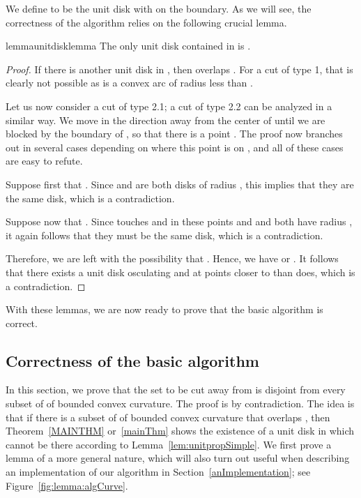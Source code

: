 \documentclass{article}
\begin{document}
We define  to be the unit disk with  on the boundary.
As we will see, the correctness of the algorithm relies on the following crucial lemma.


\begin{restatable}{lemma}{unitdisklemma}
\label{lem:unitpropSimple}
The only unit disk contained in  is .
\end{restatable}

\begin{proof}
If there is another unit disk  in , then  overlaps .
For a cut of type 1, that is clearly not possible as  is a convex arc of radius less than .

Let us now consider a cut of type 2.1; a cut of type 2.2 can be analyzed in a similar way.
We move  in the direction away from the center of  until we are blocked by the boundary of , so that there is a point .
The proof now branches out in several cases depending on where this point  is on , and all of these cases are easy to refute.
 
Suppose first that .
Since  and  are both disks of radius , this implies that they are the same disk, which is a contradiction.

Suppose now that .
Since  touches  and  in these points and  and  both have radius , it again follows that they must be the same disk, which is a contradiction.

Therefore, we are left with the possibility that .
Hence, we have  or .
It follows that there exists a unit disk osculating  and  at points closer to  than  does, which is a contradiction.
\end{proof}

With these lemmas, we are now ready to prove that the basic algorithm is correct.

\subsection{Correctness of the basic algorithm}\label{correctness}

In this section, we prove that the set  to be cut away from 
is disjoint from every subset of  of bounded convex curvature.
The proof is by contradiction. The idea is that if there is a subset of
 of bounded convex curvature
that overlaps , then Theorem~\ref{MAINTHM} or~\ref{mainThm} shows the existence of a unit disk in  which cannot be there according to Lemma~\ref{lem:unitpropSimple}.
We first prove a lemma of a more general nature, which will also turn out useful when describing an implementation of our algorithm in Section~\ref{anImplementation}; see Figure~\ref{fig:lemma:algCurve}.
\end{document}
